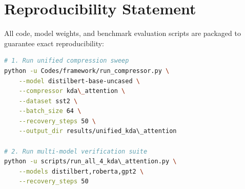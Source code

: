 \section{Reproducibility Statement}
All code, model weights, and benchmark evaluation scripts are packaged to guarantee exact reproducibility:
\begin{lstlisting}[language=bash]
# 1. Run unified compression sweep
python -u Codes/framework/run_compressor.py \
    --model distilbert-base-uncased \
    --compressor kda\_attention \
    --dataset sst2 \
    --batch_size 64 \
    --recovery_steps 50 \
    --output_dir results/unified_kda\_attention

# 2. Run multi-model verification suite
python -u scripts/run_all_4_kda\_attention.py \
    --models distilbert,roberta,gpt2 \
    --recovery_steps 50
\end{lstlisting}
